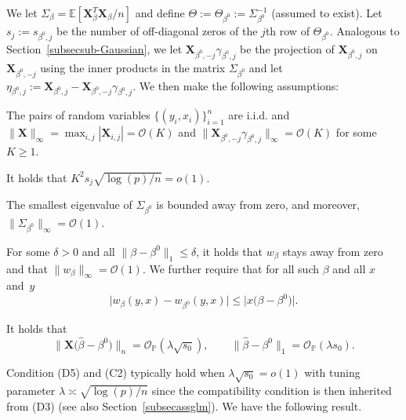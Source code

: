 \documentclass[aos,MSNbibl,dvips]{arximspdf}
\newcommand{\PP}{\mathbb{P}}
\newcommand{\EE}{\mathbb{E}}
\newcommand{\bx}{\mathbf{X}}
\begin{document}
We let $\Sigma_{\beta} = \EE[\bx_{{\beta}}^T \bx_{{\beta}}/ n]$
and define
$\Theta:= \Theta_{\beta^0}:= \Sigma_{\beta^0}^{-1}$ (assumed to exist).
Let $s_j:= s_{\beta^0, j} $ be the number of off-diagonal zeros of the
$j$th row of $\Theta_{\beta^0} $.
Analogous to Section~\ref{subsecsub-Gaussian},\vspace*{1pt} we let $\bx_{\beta
^0, -j}
\gamma_{{\beta^0},j} $ be the
projection of $\bx_{{\beta^0}, j} $ on $\bx_{{\beta^0}, -j}$ using the
inner products in the matrix $\Sigma_{\beta^0}$ and let $\eta_{\beta^0,
j}:= \bx_{{\beta^0}, j }- \bx_{{\beta^0}, -j} \gamma_{\beta^0,j}$.
We then make the following assumptions:
%
\begin{longlist}[(D1)]
%
\item[(D1)] The pairs of random variables $\{(y_i, x_i)
\}_{i=1}^n $ are i.i.d. and $\|\bx\|_{\infty} = \max_{i,j}|\bx
_{i,j}| =
{\mathcal O}(K)$ and
$\|\bx_{\beta^0, -j} \gamma_{\beta^0, j} \|_{\infty}
= {\mathcal O} (K) $ for some $K \ge1$.

\item[(D2)] It holds that $K^2 s_j
\sqrt{\log(p)/ n } = o (1)$.

\item[(D3)] The smallest eigenvalue
of $\Sigma_{\beta^0} $ is bounded away from zero, and moreover, $\|
\Sigma_{\beta^0}
\|_{\infty}= {\mathcal O} (1) $.

\item[(D4)] For some $\delta>0$ and all $\| \beta- \beta^0 \|_1 \le
\delta$, it holds that
$w_{\beta} $ stays away from zero and that $\| w_{\beta} \|_{\infty} =
{\mathcal O} (1) $. We further require that for all such $\beta$ and
all $x$ and~$y$
%
\[
\bigl| w_{\beta}(y, x) - w_{\beta^0} (y,x) \bigr| \le\bigl| x \bigl( \beta-
\beta^0\bigr) \bigr|. %
\]

\item[(D5)]
It holds that
%
\[
\bigl\| \bx\bigl( \hat\beta- \beta^0\bigr) \bigr\|_n = {\mathcal
O}_{\PP} ( \lambda \sqrt{s_0 } ),\qquad\bigl \| \hat\beta-
\beta^0 \bigr\|_1 = {\mathcal O}_{\PP} ( \lambda
s_0 ). %
\]
\end{longlist}
%
Condition (D5) and (C2) typically hold when $\lambda\sqrt{s_0} = o(1)$
with tuning parameter $\lambda
\asymp\sqrt{\log(p)/n}$ since the compatibility condition is then
inherited from (D3) (see also Section~\ref{subsecassglm}).
We have the following result.
%
\end{document}
